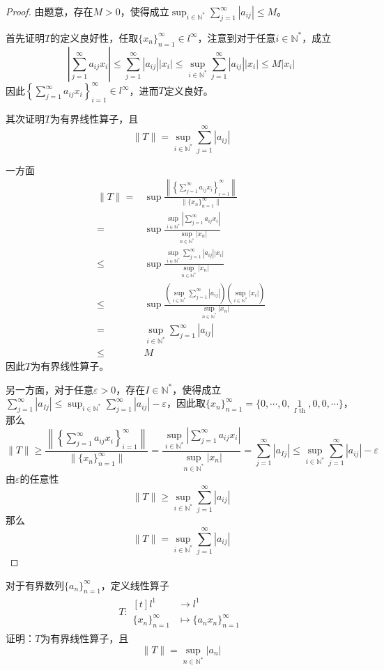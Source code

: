 \documentclass[lang = cn, scheme = chinese, 10pt]{elegantbook}
\newcommand{\N}{\mathbb{N}}  %
\begin{document}
\begin{proof}
	由题意，存在$M>0$，使得成立$\displaystyle \sup_{i\in\N^*}\sum_{j=1}^{\infty}|a_{ij}|\le M$。
	
	首先证明$T$的定义良好性，任取$\{x_n\}_{n=1}^{\infty}\in l^\infty$，注意到对于任意$i\in\N^*$，成立
	$$
	\left| \sum_{j=1}^{\infty}a_{ij}x_i  \right|\le \sum_{j=1}^{\infty}|a_{ij}||x_i|
	\le \sup_{i\in\N^*}\sum_{j=1}^{\infty}|a_{ij}||x_i|\le M|x_i|
	$$
	因此$\displaystyle \left\{\sum_{j=1}^{\infty}a_{ij}x_i\right\}_{i=1}^{\infty}\in l^\infty$，进而$T$定义良好。
	
	其次证明$T$为有界线性算子，且
	$$
	\|T\|=\sup_{i\in\N^*}\sum_{j=1}^{\infty}|a_{ij}|
	$$
	
	一方面
	\nonumber\begin{align}
		\|T\|=&\sup\frac{\left\|  \left\{ \sum_{j=1}^{\infty}a_{ij}x_i \right\}_{i=1}^{\infty} \right\|}{\| \{x_n\}_{n=1}^{\infty} \|}\\
		=&\sup\frac{\sup\limits_{i\in\N^*}|\sum_{j=1}^{\infty}a_{ij}x_i|}{\sup\limits_{n\in\N^*}|x_n|}\\
		\le & \sup\frac{\sup\limits_{i\in\N^*}\sum_{j=1}^{\infty}|a_{ij}||x_i|}{\sup\limits_{n\in\N^*}|x_n|}\\
		\le & \sup\frac{\left(\sup\limits_{i\in\N^*}\sum_{j=1}^{\infty}|a_{ij}|\right)\left(\sup\limits_{i\in\N^*}|x_i|\right)}{\sup\limits_{n\in\N^*}|x_n|}\\
		=&\sup\limits_{i\in\N^*}\sum_{j=1}^{\infty}|a_{ij}|\\
		\le &M
	\end{align}
	因此$T$为有界线性算子。
	
	另一方面，对于任意$\varepsilon>0$，存在$I\in\N^*$，使得成立$\displaystyle \sum_{j=1}^{\infty}|a_{Ij}|\le \sup_{i\in\N^*}\sum_{j=1}^{\infty}|a_{ij}|-\varepsilon$，因此取$\{ x_n \}_{n=1}^\infty=\{ 0,\cdots,0,\mathop{1}\limits_{I \text{ th}},0,0,\cdots \}$，那么
	$$
	\|T\|
	\ge\frac{\left\|  \left\{ \sum_{j=1}^{\infty}a_{ij}x_i \right\}_{i=1}^{\infty} \right\|}{\| \{x_n\}_{n=1}^{\infty} \|}
	=\frac{\sup\limits_{i\in\N^*}|\sum_{j=1}^{\infty}a_{ij}x_i|}{\sup\limits_{n\in\N^*}|x_n|}
	=\sum_{j=1}^{\infty}|a_{Ij}|
	\le \sup_{i\in\N^*}\sum_{j=1}^{\infty}|a_{ij}|-\varepsilon
	$$
	由$\varepsilon$的任意性
	$$
	\|T\|\ge \sup_{i\in\N^*}\sum_{j=1}^{\infty}|a_{ij}|
	$$
	那么
	$$
	\|T\|=\sup_{i\in\N^*}\sum_{j=1}^{\infty}|a_{ij}|
	$$
\end{proof}

\begin{proposition}
	对于有界数列$\{ a_n \}_{n=1}^{\infty}$，定义线性算子
	\nonumber\begin{align}
		T:\begin{aligned}[t]
			l^1&\longrightarrow l^1\\
			\{ x_n \}_{n=1}^{\infty}&\longmapsto \{ a_nx_n \}_{n=1}^{\infty}
		\end{aligned}
	\end{align}
	证明：$T$为有界线性算子，且
	$$
	\|T\|=\sup_{n\in\N^*}|a_n|
	$$
\end{proposition}
\end{document}
